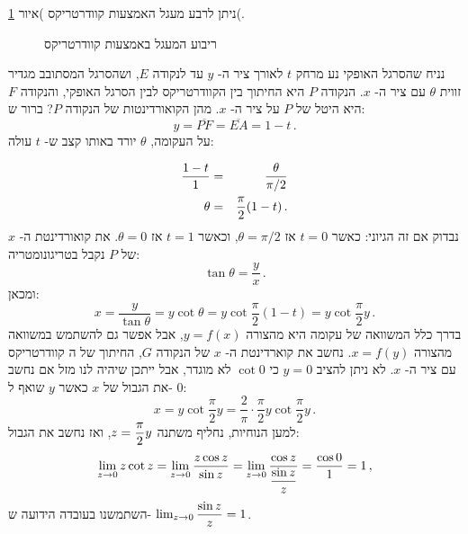 ניתן לרבע מעגל האמצעות קוודרטריקס )איור
\ref{f.quad-square}(.
\begin{figure}[tb]
\begin{center}

\end{center}
\caption{ריבוע המעגל באמצעות קוודרטריקס}\label{f.quad-square}
\end{figure}
נניח שהסרגל האופקי נע מרחק 
$t$
לאורך ציר ה-%
$y$
עד לנקודה
$E$,
ושהסרגל המסתובב מגדיר זווית 
$\theta$
עם ציר ה-%
$x$.
הנקודה 
$P$
היא החיתוך בין הקוודרטריקס לבין הסרגל האופקי, והנקודה
$F$
היא היטל של 
$P$
על ציר ה-%
$x$.
מהן הקואורדינטות של הנקודה 
$P$?
ברור ש:
\[
y=\overline{PF}=\overline{EA}=1-t\,.
\]
על העקומה,
$\theta$
יורד באותו קצב ש-%
$t$
עולה:

\begin{eqnarray*}
\displaystyle\frac{1-t}{1} &=& \displaystyle\frac{\theta}{\pi/2}\\
\theta &=&\displaystyle\frac{\pi}{2}(1-t)\,.
\end{eqnarray*}
נבדוק אם זה הגיוני: כאשר
$t\!=\!0$
אז
$\theta\!=\!\pi/2$,
וכאשר
$t\!=\!1$
אז
$\theta\!=\!0$.
את קואורדינטת ה-%
$x$
של
$P$
נקבל בטריגונומטריה:
\[
\tan \theta = \frac{y}{x}\,.
\]
ומכאן:
\[
x = \frac{y}{\tan\theta}=y\cot\theta=y\cot \frac{\pi}{2}(1-t)=y\cot \frac{\pi}{2}y\,.
\]
בדרך כלל המשוואה של עקומה היא מהצורה
$y=f(x)$,
אבל אפשר גם להשתמש במשוואה מהצורה
$x=f(y)$.
נחשב את קוארדינטת ה-%
$x$
של הנקודה 
$G$,
החיתוך של ה%
קוודרטריקס
עם ציר ה-%
$x$.
לא ניתן להציב
$y=0$
כי
$\cot 0$
לא מוגדר, אבל ייתכן שיהיה לנו מזל אם נחשב את הגבול של
$x$
כאשר 
$y$
שואף ל-%
$0$:
\[
x = y\cot \frac{\pi}{2}y = \frac{2}{\pi}\cdot \frac{\pi}{2}y\cot \frac{\pi}{2}y\,.
\]
למען הנוחיות, נחליף משתנה
$z=\displaystyle\frac{\pi}{2}y$,
ואז נחשב את הגבול:
\[
\lim_{z\rightarrow 0} z\cot z = \lim_{z\rightarrow 0} \frac{z\cos z}{\sin z} = \lim_{z\rightarrow 0} \frac{\cos z}{\displaystyle\frac{\sin z}{z}} = \frac{\cos 0}{1} = 1\,,
\]
השתמשנו בעובדה הידועה ש-%
$\lim_{z\rightarrow 0} \displaystyle\frac{\sin z}{z}=1$.

